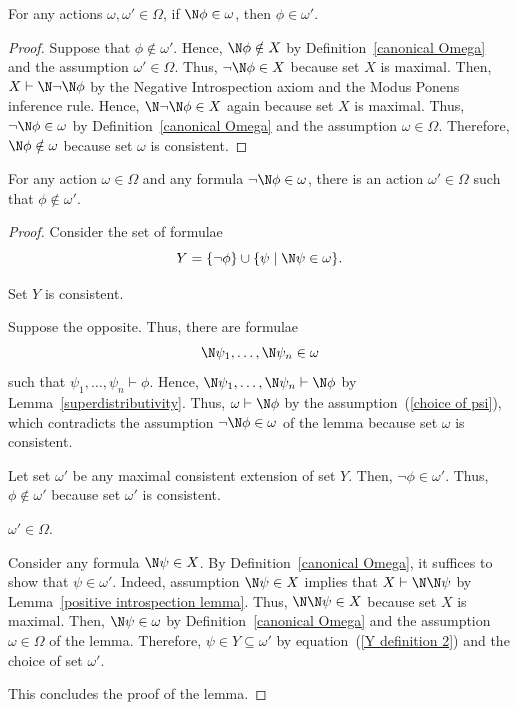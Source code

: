 \documentclass[letterpaper]{article}
\begin{document}
\begin{lemma}\label{N child all}
For any actions $\omega,\omega'\in\Omega$, if $\N\phi\in\omega$, then $\phi\in\omega'$.
\end{lemma}
\begin{proof}
Suppose that $\phi\notin\omega'$.  Hence, $\N\phi\notin X$ by Definition~\ref{canonical Omega} and the assumption $\omega'\in\Omega$. Thus, $\neg\N\phi\in X$ because set $X$ is maximal. Then, $X\vdash\N\neg\N\phi$ by the Negative Introspection axiom and the Modus Ponens inference rule. Hence, $\N\neg\N\phi\in X$ again because set $X$ is maximal. Thus, $\neg\N\phi\in\omega$ by Definition~\ref{canonical Omega} and the assumption  $\omega\in\Omega$. Therefore, $\N\phi\notin \omega$ because set $\omega$ is consistent.
\end{proof}

\begin{lemma}\label{N child exists}
For any action $\omega\in\Omega$ and any formula $\neg\N\phi\in\omega$, there is an action $\omega'\in\Omega$ such that $\phi\notin\omega'$.
\end{lemma}
\begin{proof}
Consider the set of formulae
\begin{equation}\label{Y definition 2}
    Y = \{\neg\phi\}\cup\{\psi\;|\;\N\psi\in \omega\}.
\end{equation}
\begin{claim}
Set $Y$ is consistent.
\end{claim}
\begin{proof-of-claim}
Suppose the opposite. Thus, there are formulae
\begin{equation}\label{choice of psi}
    \N\psi_1,\dots,\N\psi_n\in \omega
\end{equation}
such that $\psi_1,\dots,\psi_n\vdash\phi$. Hence, $\N\psi_1,\dots,\N\psi_n\vdash\N\phi$ by Lemma~\ref{superdistributivity}. Thus, $\omega\vdash\N\phi$ by the assumption~(\ref{choice of psi}), which contradicts the assumption $\neg\N\phi\in\omega$ of the lemma because set $\omega$ is consistent.
\end{proof-of-claim}
Let set $\omega'$ be any maximal consistent extension of set $Y$. Then, $\neg\phi\in \omega'$. Thus, $\phi\notin \omega'$ because set $\omega'$ is consistent.

\begin{claim}
$\omega'\in \Omega$.
\end{claim}
\begin{proof-of-claim}
Consider any formula $\N\psi\in X$. By Definition~\ref{canonical Omega}, it suffices to show that $\psi\in\omega'$. Indeed, assumption  $\N\psi\in X$ implies that $X\vdash\N\N\psi$ by Lemma~\ref{positive introspection lemma}. Thus, $\N\N\psi\in X$ because set $X$ is maximal. Then, $\N\psi\in\omega$ by Definition~\ref{canonical Omega} and the assumption $\omega\in\Omega$ of the lemma. Therefore, $\psi\in Y\subseteq \omega'$ by equation~(\ref{Y definition 2}) and the choice of set $\omega'$.
\end{proof-of-claim}
This concludes the proof of the lemma.
\end{proof}
\end{document}
